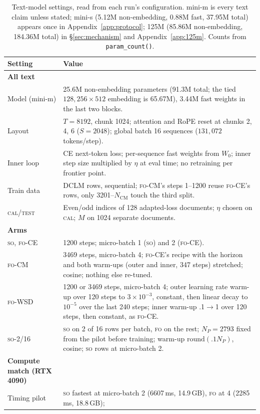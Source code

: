 \documentclass[11pt]{article}
\newcommand{\FO}{\textsc{fo}}
\newcommand{\SO}{\textsc{so}}
\newcommand{\SOp}{\textsc{so}-2/16}
\begin{document}
\begin{table}[!htbp]
\centering
\caption{Text-model settings, read from each run's configuration. mini-m is every text claim unless
stated; mini-s (5.12M non-embedding, 0.88M fast, 37.95M total) appears once in
Appendix~\ref{app:protocol}; 125M (85.86M non-embedding, 184.36M total) in \S\ref{sec:mechanism} and
Appendix~\ref{app:125m}. Counts from \texttt{param\_count()}.}
\label{tab:hparams}
\scriptsize
\begin{tabular}{@{}L{2.6cm}L{10.9cm}@{}}
\toprule
Setting & Value \\
\midrule
\textbf{All text} & \\
Model (mini-m) & 25.6M non-embedding parameters (91.3M total; the tied $128{,}256\times512$ embedding is
65.67M), 3.44M fast weights in the last two blocks. \\
Layout & $T=8192$, chunk 1024; attention and RoPE reset at chunks 2, 4, 6 ($S=2048$); global batch 16
sequences ($131{,}072$ tokens/step). \\
Inner loop & CE next-token loss; per-sequence fast weights from $W_0$; inner step size multiplied by
$\eta$ at eval time; no retraining per frontier point. \\
Train data & DCLM rows, sequential; \FO-CM's steps 1--1200 reuse \FO-CE's rows, only
3201--$N_{\text{CM}}$ touch the third split. \\
\textsc{cal}/\textsc{test} & Even/odd indices of 128 adapted-loss documents; $\eta$ chosen on \textsc{cal};
$M$ on 1024 separate documents. \\
\midrule
\textbf{Arms} & \\
\SO, \FO-CE & 1200 steps; micro-batch 1 (\SO) and 2 (\FO-CE). \\
\FO-CM{} & 3469 steps, micro-batch 4; \FO-CE's recipe with the horizon and both warm-ups (outer and
inner, 347 steps) stretched; cosine; nothing else re-tuned. \\
\FO-WSD{} & 1200 or 3469 steps, micro-batch 4; outer learning rate warm-up over 120 steps to
$3\times10^{-3}$, constant, then linear decay to $10^{-5}$ over the last 240 steps; inner warm-up
.1$\to$1 over 120 steps, then constant, as \FO-CE. \\
\SOp{} & \SO{} on 2 of 16 rows per batch, \FO{} on the rest; $N_P=2793$ fixed from the pilot before
training; warm-up $\mathrm{round}(.1N_P)$, cosine; \SO{} rows at micro-batch 2. \\
\midrule
\textbf{Compute match (RTX 4090)} & \\
Timing pilot & \SO{} fastest at micro-batch 2 (6607\,ms, 14.9\,GB), \FO{} at 4 (2285\,ms, 18.8\,GB);

\end{tabular}
\end{table}
\end{document}
